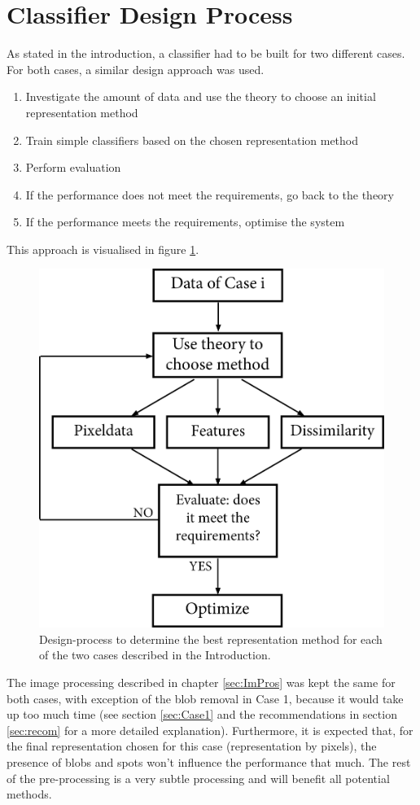 \section{Classifier Design Process}
\label{sec:ClasDes}
As stated in the introduction, a classifier had to be built for two different cases. For both cases, a similar design approach was used. \begin{enumerate}
	\item Investigate the amount of data and use the theory to choose an initial representation method
	\item Train simple classifiers based on the chosen representation method
	\item Perform evaluation
	\item If the performance does not meet the requirements, go back to the theory
	\item If the performance meets the requirements, optimise the system
\end{enumerate}
This approach is visualised in figure \ref{fig:case_design}.
\begin{figure}[H]
	\centering
	\includegraphics[scale=0.55]{images/Case_Design.jpg}
	\caption{Design-process to determine the best representation method for each of the two cases described in the Introduction.}
	\label{fig:case_design}
\end{figure}
\noindent The image processing described in chapter \ref{sec:ImPros} was kept the same for both cases, with exception of the blob removal in Case 1, because it would take up too much time (see section \ref{sec:Case1} and the recommendations in section \ref{sec:recom} for a more detailed explanation). Furthermore, it is expected that, for the final representation chosen for this case (representation by pixels), the presence of blobs and spots won't influence the performance that much.  The rest of the pre-processing is a very subtle processing and will benefit all potential methods.

